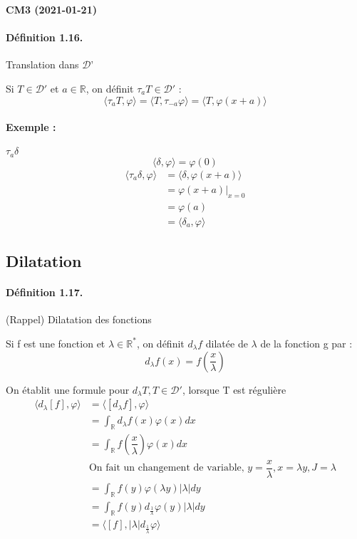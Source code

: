 \documentclass[12pt,a4paper]{report}
\newcommand{\ens}[1]{\ensuremath{\mathbb{#1}}}
\newcommand{\D}{\ensuremath{\mathcal{D}}}
\begin{document}
\begin{center}
\textbf{CM3 (2021-01-21)}
\end{center}

\paragraph{Définition 1.16.} Translation dans \D'

Si \(T \in \D'\) et \(a \in \ens{R}\), on définit \(\tau_a T \in \D'\) :
\[
	\langle \tau_a T, \varphi \rangle = \langle T, \tau_{-a} \varphi \rangle = \langle T, \varphi(x+a) \rangle
\]

\paragraph{Exemple :} \(\tau_a \delta\)
\[
	\langle \delta, \varphi \rangle = \varphi(0)
\]
\begin{align*}
	\langle \tau_a \delta, \varphi \rangle &= \langle \delta, \varphi(x+a) \rangle\\
	&= \varphi (x+a)\vert_{x = 0}\\
	&= \varphi(a)\\
	&= \langle \delta_a, \varphi \rangle
\end{align*}

\subsection{Dilatation}

\paragraph{Définition 1.17.} (Rappel) Dilatation des fonctions

Si f est une fonction et \(\lambda \in \ens{R^*}\), on définit \(d_\lambda f\) dilatée de \(\lambda\) de la fonction g par :
\[
	d_\lambda f (x) = f(\dfrac{x}{\lambda}) 
\]

On établit une formule pour \(d_\lambda T, T \in \D'\), lorsque T est régulière
\begin{align*}
	\langle d_\lambda [f], \varphi \rangle &= \langle \left[d_\lambda f\right], \varphi \rangle\\
	&= \int_{\ens{R}} d_\lambda f(x) \varphi(x) dx\\
	&= \int_{\ens{R}} f(\dfrac{x}{\lambda}) \varphi(x) dx\\
	& \text{On fait un changement de variable, } y= \dfrac{x}{\lambda}, x = \lambda y, J = \lambda\\
	&= \int_{\ens{R}} f(y) \varphi (\lambda y) \vert \lambda \vert dy\\
	&= \int_{\ens{R}} f(y) d_{\frac{1}{\lambda}}\varphi (y) \vert \lambda \vert dy\\
	&= \langle [f], \vert \lambda \vert d_{\frac{1}{\lambda}} \varphi \rangle
\end{align*}
\end{document}
